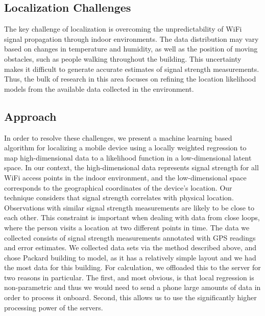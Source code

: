 \subsection{Localization Challenges}
The key challenge of localization is overcoming the unpredictability
of WiFi signal propagation through indoor environments. The data
distribution may vary based on changes in temperature and humidity, as
well as the position of moving obstacles, such as people walking
throughout the building. This uncertainty makes it difficult to
generate accurate estimates of signal strength measurements. Thus, the
bulk of research in this area focuses on refining the location
likelihood models from the available data collected in the
environment.

\subsection{Approach}
In order to resolve these challenges, we present a machine learning
based algorithm for localizing a mobile device using a locally
weighted regression to map high-dimensional data to a likelihood
function in a low-dimensional latent space. In our context, the
high-dimensional data represents signal strength for all WiFi access
points in the indoor environment, and the low-dimensional space
corresponds to the geographical coordinates of the device's location.
Our technique considers that signal strength correlates with physical
location. Observations with similar signal strength measurements are
likely to be close to each other. This constraint is important when
dealing with data from close loops, where the person visits a location
at two different points in time.
The data we collected consists of signal strength measurements
annotated with GPS readings and error estimates. We collected data
sets via the method described above, and chose Packard building to model,
as it has a relatively simple layout and we had the most data for this building.
For calculation, we offloaded this to the server for two reasons in particular.
The first, and most obvious, is that local regression is non-parametric and 
thus we would need to send a phone large amounts of data in order to process it
onboard.  Second, this allows us to use the significantly higher processing power
of the servers.
